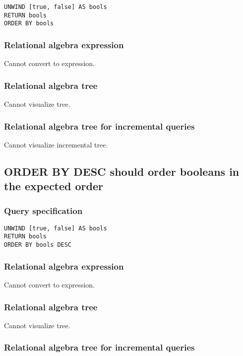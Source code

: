 \begin{lstlisting}
UNWIND [true, false] AS bools
RETURN bools
ORDER BY bools
\end{lstlisting}

\subsubsection*{Relational algebra expression}

Cannot convert to expression.

\subsubsection*{Relational algebra tree}

Cannot visualize tree.

\subsubsection*{Relational algebra tree for incremental queries}

Cannot visualize incremental tree.

\subsection{ORDER BY DESC should order booleans in the expected order}

\subsubsection*{Query specification}

\begin{lstlisting}
UNWIND [true, false] AS bools
RETURN bools
ORDER BY bools DESC
\end{lstlisting}

\subsubsection*{Relational algebra expression}

Cannot convert to expression.

\subsubsection*{Relational algebra tree}

Cannot visualize tree.

\subsubsection*{Relational algebra tree for incremental queries}


